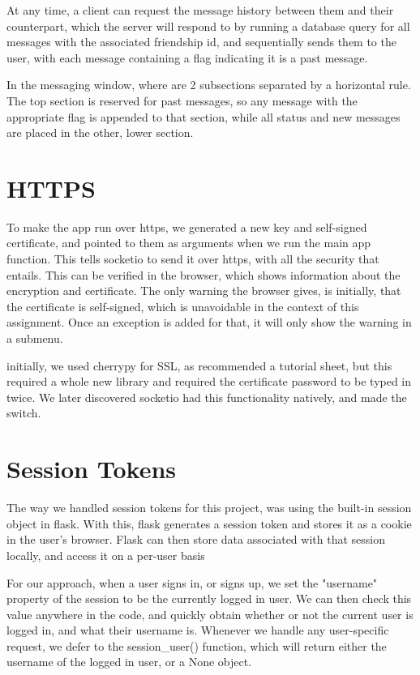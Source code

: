 \documentclass[12pt]{article}
\newcommand{\bryce}{\hfill\normalsize\sc [bkni0201]}
\begin{document}
At any time, a client can request the message history between them and their counterpart, which the server will respond to by running a database query for all messages with the associated friendship id, and sequentially sends them to the user, with each message containing a flag indicating it is a past message.

In the messaging window, where are 2 subsections separated by a horizontal rule. The top section is reserved for past messages, so any message with the appropriate flag is appended to that section, while all status and new messages are placed in the other, lower section.

\section[HTTPS]{HTTPS \bryce}

To make the app run over https, we generated a new key and self-signed certificate, and pointed to them as arguments when we run the main app function. This tells socketio to send it over https, with all the security that entails. This can be verified in the browser, which shows information about the encryption and certificate. The only warning the browser gives, is initially, that the certificate is self-signed, which is unavoidable in the context of this assignment. Once an exception is added for that, it will only show the warning in a submenu.

initially, we used cherrypy for SSL, as recommended a tutorial sheet, but this required a whole new library and required the certificate password to be typed in twice. We later discovered socketio had this functionality natively, and made the switch.

\section[Session Tokens]{Session Tokens \bryce}

The way we handled session tokens for this project, was using the built-in session object in flask. With this, flask generates a session token and stores it as a cookie in the user's browser. Flask can then store data associated with that session locally, and access it on a per-user basis

For our approach, when a user signs in, or signs up, we set the "username" property of the session to be the currently logged in user. We can then check this value anywhere in the code, and quickly obtain whether or not the current user is logged in, and what their username is. Whenever we handle any user-specific request, we defer to the session\_user() function, which will return either the username of the logged in user, or a None object.
\end{document}
